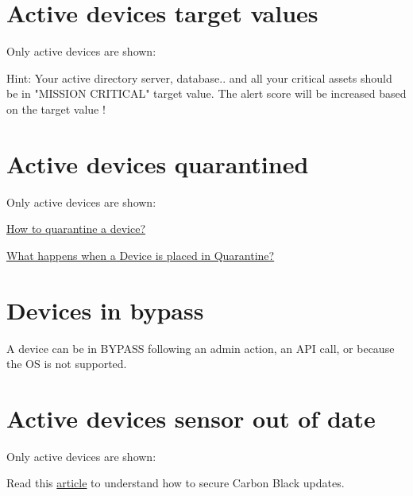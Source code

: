 

\section{Active devices target values}

Only \gls{active} devices are shown:



\begin{tipblock}
Hint: Your active directory server, database.. and all your critical assets should be in "MISSION CRITICAL" target value. The alert score will be increased based on the target value !
\end{tipblock}


\section{Active devices quarantined}

Only \gls{active} devices are shown:



\begin{tipblock}
 \href{https://community.carbonblack.com/t5/Knowledge-Base/Carbon-Black-Cloud-How-to-Quarantine-a-Device-from-the-Carbon/ta-p/71739}{How to quarantine a device?}
\end{tipblock}

\begin{tipblock}
	\href{https://community.carbonblack.com/t5/Knowledge-Base/Endpoint-Standard-What-happens-when-a-Device-is-placed-in/ta-p/71741}{What happens when a Device is placed in Quarantine?}
\end{tipblock}

\section{Devices in bypass}




\begin{tipblock}
A device can be in BYPASS following an admin action, an API call, or because the OS is not supported.
\end{tipblock}

\section{Active devices sensor out of date}

Only \gls{active} devices are shown:



Read this \href{https://carbonblack.vmware.com/resource/secure-carbon-black-cloud-updates}{article} to understand how to secure Carbon Black updates.\\
